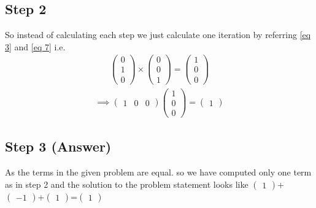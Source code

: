 \documentclass[journal,12pt,twocolumn]{IEEEtran}
\newcommand{\myvec}[1]{\ensuremath{\begin{pmatrix}#1\end{pmatrix}}}
\begin{document}
\subsection{Step 2}
So instead of calculating each step we just calculate one iteration by referring \eqref{eq 3} and \eqref{eq 7} i.e.
\begin{align}
\myvec{0\\1\\0}\times
\myvec{0\\0\\1}=
\myvec{1\\0\\0}
\end{align}
\begin{align}
\implies
\myvec{1&0&0}
\myvec{1\\0\\0}=
\myvec{1}
\end{align}
\subsection{Step 3 (Answer)}
As the terms in the given problem are equal. so we have computed only one term as in step 2 and the solution to the problem statement looks like
\myvec{1}+\myvec{-1}+\myvec{1}=\myvec{1}
\end{document}
